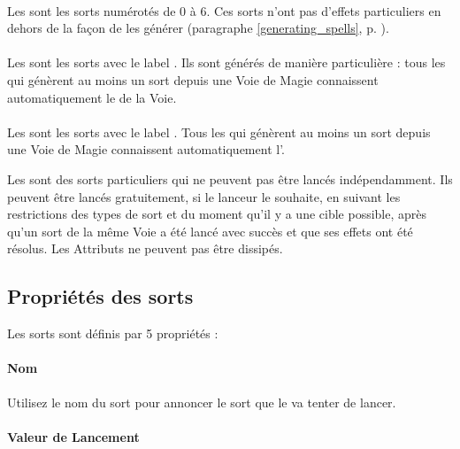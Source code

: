 \paragraph{\learnedspells}

Les \learnedspells{} sont les sorts numérotés de 0 à 6. Ces sorts n'ont pas d'effets particuliers en dehors de la façon de les générer (paragraphe \ref{generating_spells}, p. \pageref{generating_spells}).

\paragraph{\traitspells}

Les \traitspells{} sont les sorts avec le label \og \traitspellnumber{} \fg{}. Ils sont générés de manière particulière : tous les \wizards{} qui génèrent au moins un sort depuis une Voie de Magie connaissent automatiquement le \traitspell{} de la Voie.

\paragraph{\attributespells}

Les \attributespells{} sont les sorts avec le label \og \attributespellnumber{} \fg{}. Tous les \wizards{} qui génèrent au moins un sort depuis une Voie de Magie connaissent automatiquement l'\attributespell{}.

Les \attributespells{} sont des sorts particuliers qui ne peuvent pas être lancés indépendamment. Ils peuvent être lancés gratuitement, si le lanceur le souhaite, en suivant les restrictions des types de sort et du moment qu'il y a une cible possible, après qu'un sort de la même Voie a été lancé avec succès et que ses effets ont été résolus. Les Attributs ne peuvent pas être dissipés.


\subsection{Propriétés des sorts}

Les sorts sont définis par 5 propriétés :

\paragraph{Nom} 

Utilisez le nom du sort pour annoncer le sort que le \wizard{} va tenter de lancer.

\paragraph{Valeur de Lancement} 


